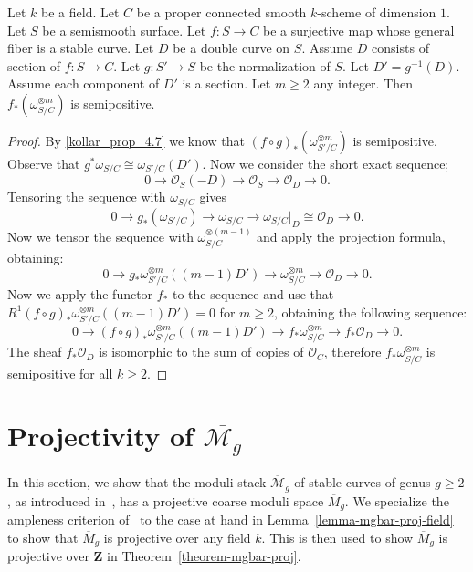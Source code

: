 \begin{lemma}
\label{kollar-theorem-4.9}
Let $k$ be a field.
Let $C$ be a proper connected smooth $k$-scheme of dimension $1$.
Let $S$ be a semismooth surface.
Let $f:S\to C$ be a surjective map whose general fiber is a stable curve.
Let $D$ be a double curve on $S$.
Assume $D$ consists of section of $f:S\to C$.
Let $g:S'\to S$ be the normalization of $S$.
Let $D'=g^{-1}(D)$.
Assume each component of $D'$ is a section.
Let $m\geq 2$ any integer.
Then $f_*(\omega_{S/C}^{\otimes m})$ is semipositive.
\end{lemma}
\begin{proof}
By \ref{kollar_prop_4.7}
we know that $(f\circ g)_*(\omega_{S'/C}^{\otimes m})$ is semipositive.
Observe that $g^*\omega_{S/C}\cong \omega_{S'/C}(D')$.
Now we consider the short exact sequence;
$$
0 \to \mathcal{O}_{S}(-D) \to \mathcal{O}_S \to \mathcal{O}_D \to 0.
$$
Tensoring the sequence with $\omega_{S/C}$ gives
$$
0 \to g_*(\omega_{S'/C}) \to \omega_{S/C} \to \omega_{S/C}\rvert_D \cong \mathcal{O}_D \to 0.
$$
Now we tensor the sequence with $\omega_{S/C}^{\otimes (m-1)}$ and apply the
projection formula, obtaining:
$$
0 \to g_*\omega_{S'/C}^{\otimes m}((m-1)D') \to \omega_{S/C}^{\otimes m}\to \mathcal{O}_D\to 0.
$$
Now we apply the functor $f_*$ to the sequence and use that
$R^1(f\circ g)_*\omega_{S'/C}^{\otimes m}((m-1)D')=0$ for $m\geq 2$,
obtaining the following sequence:
$$
  0 \to
  (f\circ g)_*\omega_{S'/C}^{\otimes m}((m-1)D') \to
  f_*\omega_{S/C}^{\otimes m} \to
  f_*\mathcal{O}_D \to
  0.
$$
The sheaf $f_*\mathcal{O}_D$ is isomorphic to the sum of copies of
$\mathcal{O}_C$, therefore $f_*\omega_{S/C}^{\otimes m}$ is semipositive for
all $k\geq 2$.
\end{proof}

\section{Projectivity of $\overline{\mathcal{M}_g}$}
In this section, we show that the moduli stack $\overline{\mathcal{M}}_g$ of
stable curves of genus $g \geq 2$, as introduced in~, has a
projective coarse moduli space $\overline{M}_g$.
We specialize the ampleness criterion of~\cite[Theorem 2.6]{ko90} to the case
at hand in Lemma~\ref{lemma-mgbar-proj-field} to show that $\overline{M}_g$
is projective over any field $k$.
This is then used to show $\overline{M}_g$ is projective over $\mathbf{Z}$
in Theorem~\ref{theorem-mgbar-proj}.

